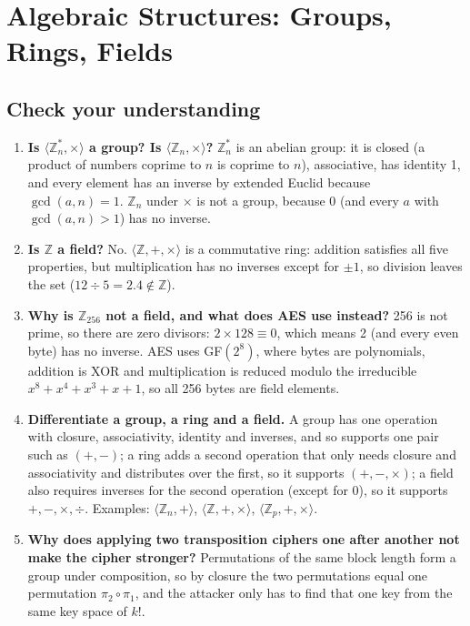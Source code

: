 \section{Algebraic Structures: Groups, Rings, Fields \hothot}\label{q:13_algebra}

\subsection*{Check your understanding}
\begin{enumerate}[leftmargin=*]
  \item \textbf{Is $\langle \mathbb{Z}_n^*, \times \rangle$ a group? Is $\langle \mathbb{Z}_n, \times \rangle$?} $\mathbb{Z}_n^*$ is an abelian group: it is closed (a product of numbers coprime to $n$ is coprime to $n$), associative, has identity 1, and every element has an inverse by extended Euclid because $\gcd(a, n) = 1$. $\mathbb{Z}_n$ under $\times$ is not a group, because 0 (and every $a$ with $\gcd(a, n) > 1$) has no inverse.
  \item \textbf{Is $\mathbb{Z}$ a field?} No. $\langle \mathbb{Z}, +, \times \rangle$ is a commutative ring: addition satisfies all five properties, but multiplication has no inverses except for $\pm 1$, so division leaves the set ($12 \div 5 = 2.4 \notin \mathbb{Z}$).
  \item \textbf{Why is $\mathbb{Z}_{256}$ not a field, and what does AES use instead?} 256 is not prime, so there are zero divisors: $2 \times 128 \equiv 0$, which means 2 (and every even byte) has no inverse. AES uses GF$(2^8)$, where bytes are polynomials, addition is XOR and multiplication is reduced modulo the irreducible $x^8 + x^4 + x^3 + x + 1$, so all 256 bytes are field elements.
  \item \textbf{Differentiate a group, a ring and a field.} A group has one operation with closure, associativity, identity and inverses, and so supports one pair such as $(+, -)$; a ring adds a second operation that only needs closure and associativity and distributes over the first, so it supports $(+, -, \times)$; a field also requires inverses for the second operation (except for 0), so it supports $+, -, \times, \div$. Examples: $\langle \mathbb{Z}_n, + \rangle$, $\langle \mathbb{Z}, +, \times \rangle$, $\langle \mathbb{Z}_p, +, \times \rangle$.
  \item \textbf{Why does applying two transposition ciphers one after another not make the cipher stronger?} Permutations of the same block length form a group under composition, so by closure the two permutations equal one permutation $\pi_2 \circ \pi_1$, and the attacker only has to find that one key from the same key space of $k!$.

\end{enumerate}
